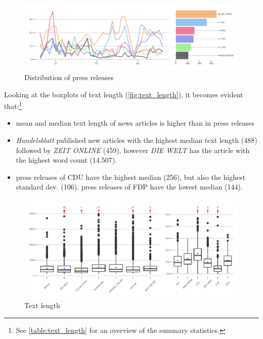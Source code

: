\documentclass[
]{article}
\providecommand{\tightlist}{%
  \setlength{\itemsep}{0pt}\setlength{\parskip}{0pt}}
\begin{document}
\begin{figure}

{\centering \includegraphics[width=0.8\linewidth]{main_text_files/figure-latex/Distribution of press releases-1} 

}

\caption{Distribution of press releases \label{fig:press_distr}}\label{fig:Distribution of press releases}
\end{figure}

Looking at the boxplots of text length (\autoref{fig:text_length}), it
becomes evident that:\footnote{See \autoref{table:text_length} for an
  overview of the summary statistics.}

\begin{itemize}
\tightlist
\item
  mean and median text length of news articles is higher than in press
  releases
\item
  \emph{Handelsblatt} published new articles with the highest median
  text length (488) followed by \emph{ZEIT ONLINE} (459), however
  \emph{DIE WELT} has the article with the highest word count (14.507).
\item
  press releases of CDU have the highest median (256), but also the
  highest standard dev. (106). press releases of FDP have the lowest
  median (144).
\end{itemize}

\begin{figure}

{\centering \includegraphics[width=1\linewidth]{main_text_files/figure-latex/text_length-1} 

}

\caption{Text length \label{fig:text_length}}\label{fig:text_length}
\end{figure}
\end{document}
